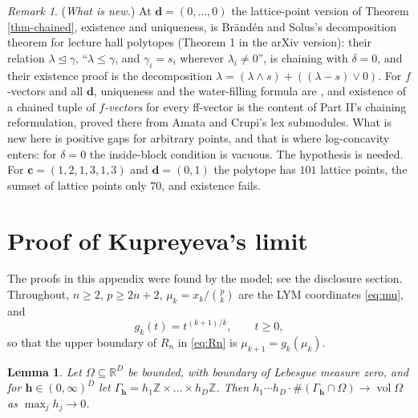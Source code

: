 \documentclass[11pt, a4paper, abstract=yes]{scrartcl}
\theoremstyle{definition}
\theoremstyle{remark}
\newtheorem{remark}[definition]{Remark}
\theoremstyle{plain}
\newtheorem{lemma}[definition]{Lemma}
\newcommand{\vek}[1]{\boldsymbol{#1}}
\theoremstyle{remark}
\theoremstyle{plain}
\newcommand{\vol}{\operatorname{vol}}
\newcommand{\leannone}{\tikz[baseline=-0.6ex]\draw[leannone,line width=0.6pt] (0,0) circle (0.55ex);}
\newcommand{\leanmark}[1]{\leavevmode{\reversemarginpar\marginnote{\raggedleft#1}}}
\begin{document}
\begin{remark}
(\emph{What is new.}) At \(\vek d=(0,\dots,0)\) the lattice-point version of Theorem \ref{thm-chained},
existence and uniqueness, is Brändén and Solus's decomposition theorem for lecture hall polytopes
\autocite[Theorem 2.1]{BrandenSolus2020} (Theorem 1 in the arXiv version): their relation
\(\lambda\trianglelefteq\gamma\), ``\(\lambda\le\gamma\), and \(\gamma_i=s_i\) wherever
\(\lambda_i\ne0\)'', is chaining with \(\delta=0\), and their existence proof is the decomposition
\(\lambda=(\lambda\wedge s)+((\lambda-s)\vee0)\). For \(f\)-vectors and all \(\vek d\), uniqueness and the
water-filling formula are \autocite[Lemma 24]{SnellmanArticle2}, and existence of a chained tuple of \emph{\(f\)-vectors}
for every ff-vector is the content of Part II's chaining reformulation, proved there from Amata and
Crupi's lex submodules. What is new here is positive gaps for arbitrary points, and that is where
log-concavity enters: for \(\delta=0\) the inside-block condition is vacuous. The hypothesis is
needed. For \(\vek c=(1,2,1,3,1,3)\) and \(\vek d=(0,1)\) the polytope has \(101\) lattice points,
the sumset of lattice points only \(70\), and existence fails.
\label{rem-chained-credit}
\end{remark}
\section{Proof of Kupreyeva's limit}
\label{sec-app-kupreyeva}
The proofs in this appendix were found by the model; see the disclosure section. Throughout,
\(n\ge2\), \(p\ge2n+2\), \(\mu_k=x_k/\binom pk\) are the LYM coordinates \eqref{eq:mu}, and
\begin{equation}\label{eq:gk}
  g_k(t)=t^{(k+1)/k},\qquad t\ge0 ,
\end{equation}
so that the upper boundary of \(R_n\) in \eqref{eq:Rn} is \(\mu_{k+1}=g_k(\mu_k)\).

\begin{lemma}
\leanmark{\leannone}Let \(\Omega\subseteq\mathbb R^D\) be bounded, with boundary of Lebesgue measure zero, and for
\(\vek h\in(0,\infty)^D\) let \(\Gamma_{\vek h}=h_1\mathbb Z\times\dots\times h_D\mathbb Z\). Then
\(h_1\cdots h_D\cdot\#(\Gamma_{\vek h}\cap\Omega)\to\vol\Omega\) as \(\max_jh_j\to0\).
\label{lem-anisotropic-count}
\end{lemma}
\end{document}
